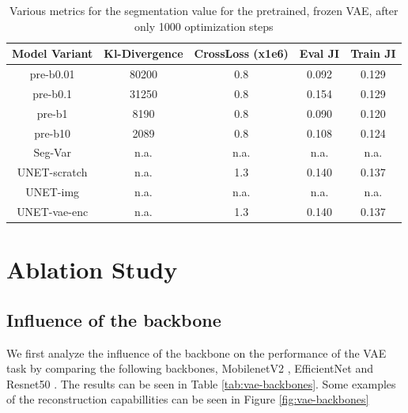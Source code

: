 \begin{table}[!ht]
    \centering
    \caption{Various metrics for the segmentation value for the pretrained, frozen VAE, after only 1000 optimization steps}
    \label{tab:seg-vae}
    \begin{tabular}{ccccc}
        \hline
        Model Variant & Kl-Divergence & CrossLoss (x1e6) & Eval JI & Train JI \\
        \hline
        pre-b0.01     & 80200         & 0.8              & 0.092   & 0.129    \\
        pre-b0.1      & 31250         & 0.8              & 0.154   & 0.129    \\
        pre-b1        & 8190          & 0.8              & 0.090   & 0.120    \\
        pre-b10       & 2089          & 0.8              & 0.108   & 0.124    \\
        Seg-Var       & n.a.          & n.a.             & n.a.    & n.a.     \\
        UNET-scratch  & n.a.          & 1.3              & 0.140   & 0.137    \\
        UNET-img      & n.a.          & n.a.             & n.a.    & n.a.     \\
        UNET-vae-enc  & n.a.          & 1.3              & 0.140   & 0.137    \\
        \hline
    \end{tabular}
\end{table}


\section{Ablation Study}
\subsection{Influence of the backbone}
We first analyze the influence of the backbone on the performance of the VAE task by comparing the following backbones, MobilenetV2 \cite{sandler2019mobilenetv2invertedresidualslinear}, EfficientNet \cite{tan2020efficientnetrethinkingmodelscaling} and Resnet50 \cite{he2015deep}. The results can be seen in Table \ref{tab:vae-backbones}. Some examples of the reconstruction capabillities can be seen in Figure \ref{fig:vae-backbones}

